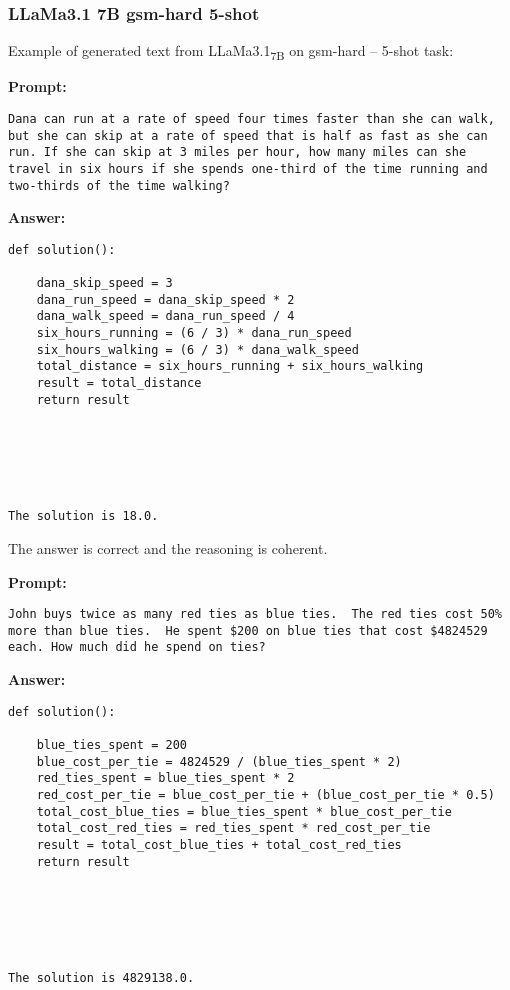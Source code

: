 \subsubsection*{LLaMa3.1 7B gsm-hard 5-shot}
\noindent Example of generated text from LLaMa3.1\textsubscript{7B} on gsm-hard -- 5-shot task:
\begin{displayquote}
	\textbf{Prompt:}
	\begin{Verbatim}[fontsize=\small,breaklines]
Dana can run at a rate of speed four times faster than she can walk, but she can skip at a rate of speed that is half as fast as she can run. If she can skip at 3 miles per hour, how many miles can she travel in six hours if she spends one-third of the time running and two-thirds of the time walking?
	\end{Verbatim}
	\textbf{Answer:}
	\begin{Verbatim}[fontsize=\small,breaklines]
def solution():

    dana_skip_speed = 3
    dana_run_speed = dana_skip_speed * 2
    dana_walk_speed = dana_run_speed / 4
    six_hours_running = (6 / 3) * dana_run_speed
    six_hours_walking = (6 / 3) * dana_walk_speed
    total_distance = six_hours_running + six_hours_walking
    result = total_distance
    return result






The solution is 18.0.
	\end{Verbatim}
\end{displayquote}
The answer is correct and the reasoning is coherent.
\begin{displayquote}
	\textbf{Prompt:}
	\begin{Verbatim}[fontsize=\small,breaklines]
John buys twice as many red ties as blue ties.  The red ties cost 50% more than blue ties.  He spent $200 on blue ties that cost $4824529 each. How much did he spend on ties?
	\end{Verbatim}
	\textbf{Answer:}
	\begin{Verbatim}[fontsize=\small,breaklines]
def solution():

    blue_ties_spent = 200
    blue_cost_per_tie = 4824529 / (blue_ties_spent * 2)
    red_ties_spent = blue_ties_spent * 2
    red_cost_per_tie = blue_cost_per_tie + (blue_cost_per_tie * 0.5)
    total_cost_blue_ties = blue_ties_spent * blue_cost_per_tie
    total_cost_red_ties = red_ties_spent * red_cost_per_tie
    result = total_cost_blue_ties + total_cost_red_ties
    return result






The solution is 4829138.0.
	\end{Verbatim}
\end{displayquote}
